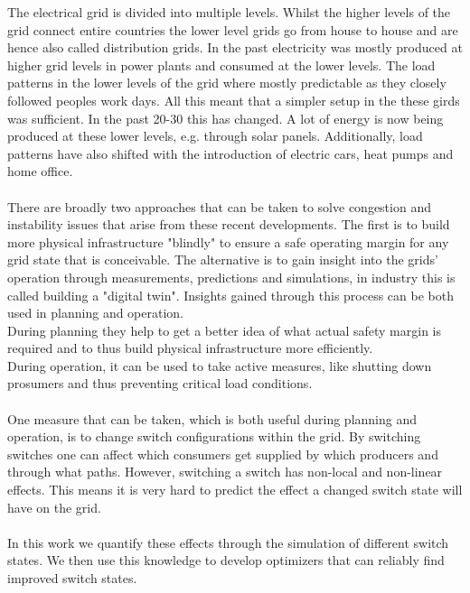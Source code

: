 The electrical grid is divided into multiple levels. 
Whilst the higher levels of the grid connect
entire countries the lower level grids go from house
to house and are hence also called 
distribution grids. In the past electricity
was mostly produced at higher grid levels in power plants
and consumed at the lower levels. The load patterns in
the lower levels of the grid where
mostly predictable as they closely followed peoples
work days. All this meant that a simpler setup
in the these girds was sufficient. In the past 20-30
this has changed. A lot of energy is now
being produced at these lower levels, e.g. through solar
panels. Additionally, load patterns have also shifted
with the introduction of electric cars,
heat pumps and home office\autocite{venios}.\\
\\
There are broadly two approaches that can be taken to solve congestion and instability 
issues that arise from these recent developments. The first is to build more
physical infrastructure "blindly" to
ensure a safe operating margin for any grid state that is conceivable. 
The alternative is to gain insight into the grids' operation through measurements,
predictions and simulations, in industry this is called building a "digital twin".
Insights gained through this process can be both used in planning and operation.\\
During planning they help to get a better idea of what actual safety margin
is required and to thus build physical infrastructure more efficiently.\\
During operation, it can be
used to take active measures, like shutting down prosumers and 
thus preventing critical load conditions.\\
\\
One measure that can be taken, which is both useful during planning and operation, is to
change switch configurations within the grid. By switching switches one
can affect which consumers get supplied by which producers and through what
paths. However, switching a switch has non-local and non-linear effects.
This means it is very hard to predict the effect a changed switch state
will have on the grid. \\
\\
In this work we quantify these effects through the simulation of
different switch states.
We then use this knowledge to develop optimizers that can reliably
find improved switch states.
